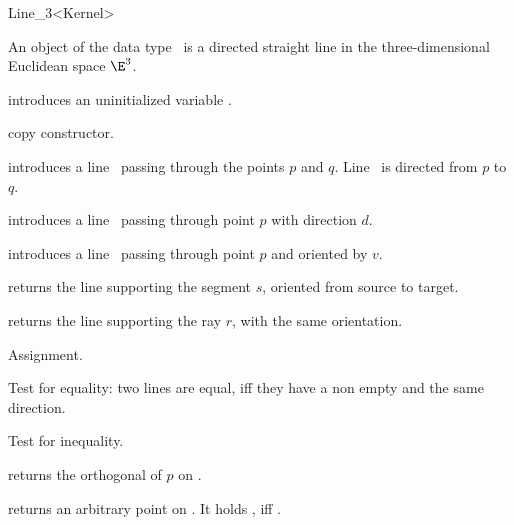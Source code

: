 \begin{ccRefClass} {Line_3<Kernel>}

\ccDefinition
An object  of the data type \ccRefName\ is a directed
straight line in the three-dimensional Euclidean space $\E^3$.

\ccCreation
{}

\ccHidden {}
             {introduces an uninitialized variable \ccVar.}

\ccHidden {}
 	    {copy constructor.}

            {introduces a line \ccVar\ passing through the points $p$ and $q$. 
             Line \ccVar\ is directed from $p$ to $q$.}


            {introduces a line \ccVar\ passing through point $p$ with 
             direction $d$.}

            {introduces a line \ccVar\ passing through point $p$ and
             oriented by $v$.}

            {returns the line supporting the segment $s$,
	    oriented from source to target.}

            {returns the line supporting the ray $r$, with the
	    same orientation.}

\ccOperations
{}

\ccHidden {}
        {Assignment.}

       {Test for equality: two lines are equal, iff they have a non 
        empty  and the same direction.}

       {Test for inequality.}

       {returns the orthogonal  of $p$ on \ccVar.}

       {returns an arbitrary point on \ccVar. It holds 
        , iff .}


\end{ccRefClass}
